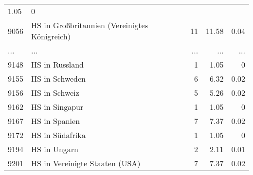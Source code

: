 \begin{longtable}{lXrrr}
          \num[round-mode=places,round-precision=2]{1,05} &
          \num[round-mode=places,round-precision=2]{0} \\
        9056 & \multicolumn{1}{X}{HS in Großbritannien (Vereinigtes Königreich)} & %
          \num{11} &
          \num[round-mode=places,round-precision=2]{11,58} &
          \num[round-mode=places,round-precision=2]{0,04} \\
       ... & ... & ... & ... & ... \\
        9148 & \multicolumn{1}{X}{HS in Russland} & %
          \num{1} &
          \num[round-mode=places,round-precision=2]{1,05} &
          \num[round-mode=places,round-precision=2]{0} \\

        9155 & \multicolumn{1}{X}{HS in Schweden} & %
          \num{6} &
          \num[round-mode=places,round-precision=2]{6,32} &
          \num[round-mode=places,round-precision=2]{0,02} \\

        9156 & \multicolumn{1}{X}{HS in Schweiz} & %
          \num{5} &
          \num[round-mode=places,round-precision=2]{5,26} &
          \num[round-mode=places,round-precision=2]{0,02} \\

        9162 & \multicolumn{1}{X}{HS in Singapur} & %
          \num{1} &
          \num[round-mode=places,round-precision=2]{1,05} &
          \num[round-mode=places,round-precision=2]{0} \\

        9167 & \multicolumn{1}{X}{HS in Spanien} & %
          \num{7} &
          \num[round-mode=places,round-precision=2]{7,37} &
          \num[round-mode=places,round-precision=2]{0,02} \\

        9172 & \multicolumn{1}{X}{HS in Südafrika} & %
          \num{1} &
          \num[round-mode=places,round-precision=2]{1,05} &
          \num[round-mode=places,round-precision=2]{0} \\

        9194 & \multicolumn{1}{X}{HS in Ungarn} & %
          \num{2} &
          \num[round-mode=places,round-precision=2]{2,11} &
          \num[round-mode=places,round-precision=2]{0,01} \\

        9201 & \multicolumn{1}{X}{HS in Vereinigte Staaten (USA)} & %
          \num{7} &
          \num[round-mode=places,round-precision=2]{7,37} &
          \num[round-mode=places,round-precision=2]{0,02} \\


\end{longtable}
